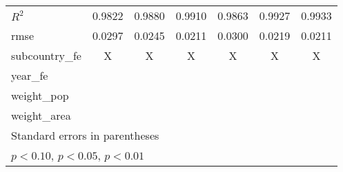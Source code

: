 {\begin{tabular}{l*{6}{c}}
\(R^{2}\)   &      0.9822         &      0.9880         &      0.9910         &      0.9863         &      0.9927         &      0.9933         \\
rmse        &      0.0297         &      0.0245         &      0.0211         &      0.0300         &      0.0219         &      0.0211         \\
subcountry\_fe&           X         &           X         &           X         &           X         &           X         &           X         \\
year\_fe     &                     &                     &                     &                     &                     &                     \\
weight\_pop  &                     &                     &                     &                     &                     &                     \\
weight\_area &                     &                     &                     &                     &                     &                     \\
\hline\hline
\multicolumn{7}{l}{\footnotesize Standard errors in parentheses}\\
\multicolumn{7}{l}{\footnotesize \sym{*} \(p<0.10\), \sym{**} \(p<0.05\), \sym{***} \(p<0.01\)}\\
\end{tabular}
}
